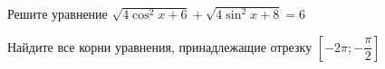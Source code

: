 \begin{ex}
	\begin{condition}
		\begin{enumcols}[label=\asbuk*)]
			\item Решите уравнение \( \sqrt{4\cos^2 x + 6} + \sqrt{4\sin^2 x + 8}  = 6 \)
			\item Найдите все корни уравнения, принадлежащие отрезку \( \left[-2\pi;-\dfrac{\pi}{2}\right] \)
		\end{enumcols}
	\end{condition}
\end{ex}